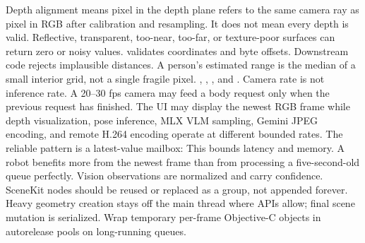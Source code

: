 {}\markdownRendererSectionBegin
{}\markdownRendererInterblockSeparator
{}Depth alignment means pixel  in the depth plane refers to the same camera ray as pixel  in RGB after calibration and resampling. It does not mean every depth is valid. Reflective, transparent, too-near, too-far, or texture-poor surfaces can return zero or noisy values.\markdownRendererParagraphSeparator
{} validates coordinates and byte offsets. Downstream code rejects implausible distances. A person's estimated range is the median of a small interior grid, not a single fragile pixel.\markdownRendererInterblockSeparator
{}
\markdownRendererSectionEnd 
\markdownRendererSectionEnd \markdownRendererSectionBegin
{}\markdownRendererInterblockSeparator
{}\markdownRendererBlockQuoteBegin
{} , , , and .\markdownRendererBlockQuoteEnd \markdownRendererInterblockSeparator
{}Camera rate is not inference rate. A 20–30 fps camera may feed a body request only when the previous request has finished. The UI may display the newest RGB frame while depth visualization, pose inference, MLX VLM sampling, Gemini JPEG encoding, and remote H.264 encoding operate at different bounded rates.\markdownRendererParagraphSeparator
{}The reliable pattern is a latest-value mailbox:\markdownRendererInterblockSeparator
{}\markdownRendererInterblockSeparator
{}This bounds latency and memory. A robot benefits more from the newest frame than from processing a five-second-old queue perfectly.\markdownRendererParagraphSeparator
{}Vision observations are normalized and carry confidence. SceneKit nodes should be reused or replaced as a group, not appended forever. Heavy geometry creation stays off the main thread where APIs allow; final scene mutation is serialized. Wrap temporary per-frame Objective-C objects in autorelease pools on long-running queues.\markdownRendererInterblockSeparator
{}
\markdownRendererSectionEnd \markdownRendererSectionBegin
